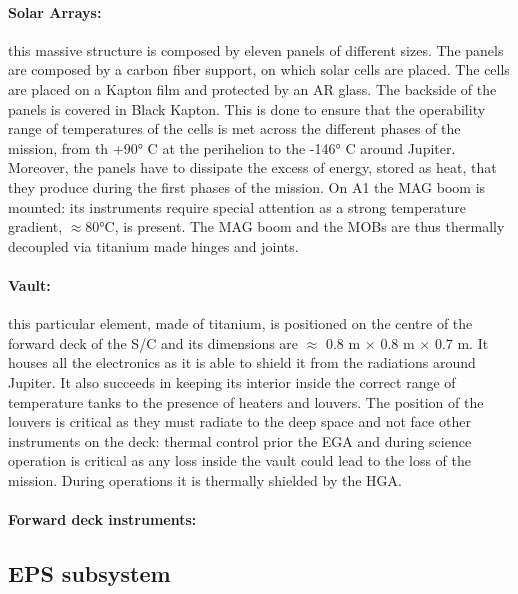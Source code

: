 \vspace{-3mm}

\paragraph{Solar Arrays:} this massive structure is composed by eleven panels of different sizes. The panels are composed by a carbon fiber support, on which solar cells are placed. The cells are placed on a Kapton film and protected by an AR glass. The backside of the panels is covered in Black Kapton. This is done to ensure that the operability range of temperatures of the cells is met across the different phases of the mission, from th +90° C at the perihelion to the -146° C around Jupiter. Moreover, the panels have to dissipate the excess of energy, stored as heat, that they produce during the first phases of the mission. On A1 the MAG boom is mounted: its instruments require special attention as a strong temperature gradient, $\approx$80°C, is present.
The MAG boom and the MOBs are thus thermally decoupled via titanium made hinges and joints.

\vspace{-3mm}

\paragraph{Vault:}this particular element, made of titanium, is positioned on the centre of the forward deck of the S/C and its dimensions are  $\approx$ 0.8 m $\times$ 0.8 m $\times$ 0.7 m. It houses all the electronics as it is able to shield it from the radiations around Jupiter. It also succeeds in keeping its interior inside the correct range of temperature tanks to the presence of heaters and louvers. The position of the louvers is critical as they must radiate to the deep space and not face other instruments on the deck: thermal control prior the EGA and during science operation is critical as any loss inside the vault could lead to the loss of the mission. During operations it is thermally shielded by the HGA.

\paragraph{Forward deck instruments:}

\vspace{-4mm}


\subsection{EPS subsystem}
\label{subsec:eps_sub}

